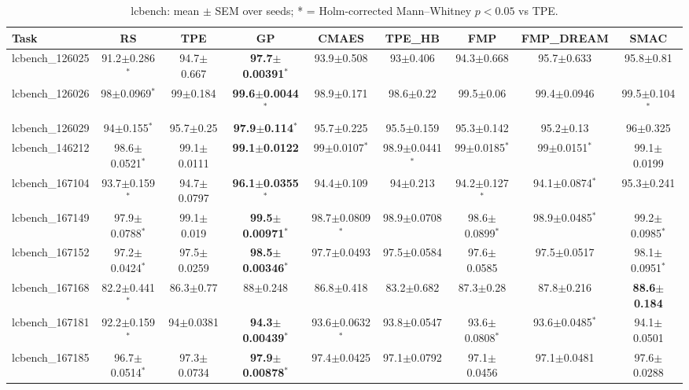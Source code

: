 \begin{table}[t]
\caption{ lcbench: mean $\pm$ SEM over seeds; * = Holm-corrected Mann--Whitney $p<0.05$ vs TPE.}
\label{tab:_lcbench}
\begin{center}\small
\begin{tabular}{lcccccccc}
\hline
Task & RS & TPE & GP & CMAES & TPE\_HB & FMP & FMP\_DREAM & SMAC \\
\hline
lcbench\_126025 & 91.2$\pm$0.286$^{*}$ & 94.7$\pm$0.667 & \textbf{97.7$\pm$0.00391}$^{*}$ & 93.9$\pm$0.508 & 93$\pm$0.406 & 94.3$\pm$0.668 & 95.7$\pm$0.633 & 95.8$\pm$0.81 \\
lcbench\_126026 & 98$\pm$0.0969$^{*}$ & 99$\pm$0.184 & \textbf{99.6$\pm$0.0044}$^{*}$ & 98.9$\pm$0.171 & 98.6$\pm$0.22 & 99.5$\pm$0.06 & 99.4$\pm$0.0946 & 99.5$\pm$0.104$^{*}$ \\
lcbench\_126029 & 94$\pm$0.155$^{*}$ & 95.7$\pm$0.25 & \textbf{97.9$\pm$0.114}$^{*}$ & 95.7$\pm$0.225 & 95.5$\pm$0.159 & 95.3$\pm$0.142 & 95.2$\pm$0.13 & 96$\pm$0.325 \\
lcbench\_146212 & 98.6$\pm$0.0521$^{*}$ & 99.1$\pm$0.0111 & \textbf{99.1$\pm$0.0122} & 99$\pm$0.0107$^{*}$ & 98.9$\pm$0.0441$^{*}$ & 99$\pm$0.0185$^{*}$ & 99$\pm$0.0151$^{*}$ & 99.1$\pm$0.0199 \\
lcbench\_167104 & 93.7$\pm$0.159$^{*}$ & 94.7$\pm$0.0797 & \textbf{96.1$\pm$0.0355}$^{*}$ & 94.4$\pm$0.109 & 94$\pm$0.213 & 94.2$\pm$0.127$^{*}$ & 94.1$\pm$0.0874$^{*}$ & 95.3$\pm$0.241 \\
lcbench\_167149 & 97.9$\pm$0.0788$^{*}$ & 99.1$\pm$0.019 & \textbf{99.5$\pm$0.00971}$^{*}$ & 98.7$\pm$0.0809$^{*}$ & 98.9$\pm$0.0708 & 98.6$\pm$0.0899$^{*}$ & 98.9$\pm$0.0485$^{*}$ & 99.2$\pm$0.0985$^{*}$ \\
lcbench\_167152 & 97.2$\pm$0.0424$^{*}$ & 97.5$\pm$0.0259 & \textbf{98.5$\pm$0.00346}$^{*}$ & 97.7$\pm$0.0493 & 97.5$\pm$0.0584 & 97.6$\pm$0.0585 & 97.5$\pm$0.0517 & 98.1$\pm$0.0951$^{*}$ \\
lcbench\_167168 & 82.2$\pm$0.441$^{*}$ & 86.3$\pm$0.77 & 88$\pm$0.248 & 86.8$\pm$0.418 & 83.2$\pm$0.682 & 87.3$\pm$0.28 & 87.8$\pm$0.216 & \textbf{88.6$\pm$0.184} \\
lcbench\_167181 & 92.2$\pm$0.159$^{*}$ & 94$\pm$0.0381 & \textbf{94.3$\pm$0.00439}$^{*}$ & 93.6$\pm$0.0632$^{*}$ & 93.8$\pm$0.0547 & 93.6$\pm$0.0808$^{*}$ & 93.6$\pm$0.0485$^{*}$ & 94.1$\pm$0.0501 \\
lcbench\_167185 & 96.7$\pm$0.0514$^{*}$ & 97.3$\pm$0.0734 & \textbf{97.9$\pm$0.00878}$^{*}$ & 97.4$\pm$0.0425 & 97.1$\pm$0.0792 & 97.1$\pm$0.0456 & 97.1$\pm$0.0481 & 97.6$\pm$0.0288 \\

\end{tabular}
\end{center}
\end{table}

